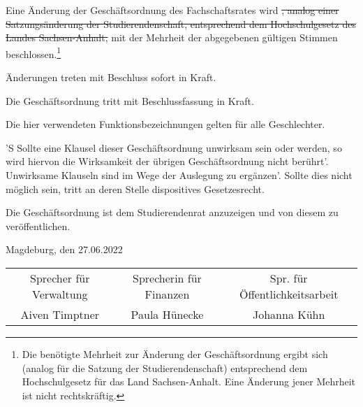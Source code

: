 \documentclass[%
	parskip=half,
]{scrartcl}
\newcommand{\add}[1]{{\color{blue} #1}}
\newcommand{\delete}[1]{{\color{red} \sout{#1}}}
\begin{document}
\begin{contract}
Eine Änderung der Geschäftsordnung des Fachschaftsrates wird\delete{, analog einer Satzungsänderung der 
Studierendenschaft, entsprechend dem Hochschulgesetz des Landes Sachsen-Anhalt,} mit der Mehrheit der abgegebenen 
gültigen Stimmen beschlossen.\footnote{\add{Die benötigte Mehrheit zur Änderung der Geschäftsordnung ergibt sich 
(analog für die Satzung der Studierendenschaft) entsprechend dem Hochschulgesetz für das Land Sachsen-Anhalt. Eine 
Änderung jener Mehrheit ist nicht rechtskräftig.}}

Änderungen treten mit Beschluss sofort in Kraft.


Die Geschäftsordnung tritt mit Beschlussfassung in Kraft.

Die hier verwendeten Funktionsbezeichnungen gelten für alle Geschlechter.

'S Sollte eine Klausel dieser Geschäftsordnung unwirksam sein oder werden, so wird hiervon die Wirksamkeit der übrigen 
Geschäftsordnung nicht berührt'. Unwirksame Klauseln sind im Wege der Auslegung zu ergänzen'. Sollte dies nicht möglich 
sein, tritt an deren Stelle dispositives Gesetzesrecht.

Die Geschäftsordnung ist dem Studierendenrat anzuzeigen und von diesem zu veröffentlichen.

\end{contract}

\vspace{1cm}

Magdeburg, den 27.06.2022

\vspace{1cm}

\begin{table}[h]
	\centering
	\begin{tabular}{ccc}
		\cmidrule(lr){1-1} \cmidrule(lr){2-2} \cmidrule(lr){3-3}
		Sprecher für Verwaltung & Sprecherin für Finanzen & Spr. für Öffentlichkeitsarbeit \\
		Aiven Timptner & Paula Hünecke & Johanna Kühn
	\end{tabular}
\end{table}
\end{document}
